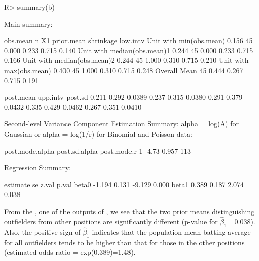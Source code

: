 \documentclass[article]{jss}
\begin{document}
\begin{CodeChunk}
\begin{CodeInput}
R> summary(b)
\end{CodeInput}
\begin{CodeOutput}
Main summary:

                            obs.mean  n    X1 prior.mean shrinkage low.intv 
Unit with min(obs.mean)        0.156 45 0.000      0.233     0.715    0.140     
Unit with median(obs.mean)1    0.244 45 0.000      0.233     0.715    0.166     
Unit with median(obs.mean)2    0.244 45 1.000      0.310     0.715    0.210     
Unit with max(obs.mean)        0.400 45 1.000      0.310     0.715    0.248     
Overall Mean                         45 0.444      0.267     0.715    0.191     


                            post.mean upp.intv post.sd
                                0.211    0.292  0.0389
                                0.237    0.315  0.0380
                                0.291    0.379  0.0432
                                0.335    0.429  0.0462
                                0.267    0.351  0.0410

Second-level Variance Component Estimation Summary:
alpha = log(A) for Gaussian or alpha =  log(1/r) for Binomial and Poisson data:

  post.mode.alpha post.sd.alpha post.mode.r
1           -4.73         0.957         113


Regression Summary:

      estimate    se  z.val p.val
beta0   -1.194 0.131 -9.129 0.000
beta1    0.389 0.187  2.074 0.038
\end{CodeOutput}
\end{CodeChunk}

From the , one of the outputs of , we see that the two prior means distinguishing outfielders from other positions are significantly different (p-value for $\hat{\beta}_1$= 0.038). Also, the positive sign of $\hat{\beta}_{1}$ indicates that the population mean batting average for all outfielders tends to be higher than that for those in the other positions (estimated odds ratio = exp(0.389)=1.48).
\end{document}
